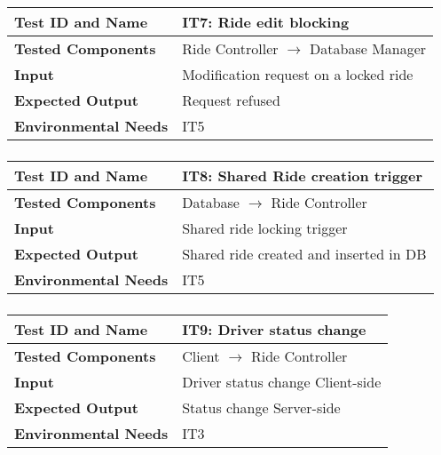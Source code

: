 \vspace{2em}

\noindent\begin{tabular}{l p{}}
    \hline
    \textbf{Test ID and Name} & \textbf{IT7: Ride edit blocking}\\
    \hline
    \textbf{Tested Components} & Ride Controller $\rightarrow$ Database Manager\\
    \hline
    \textbf{Input} & Modification request on a locked ride\\
    \hline
    \textbf{Expected Output} & Request refused\\
    \hline
    \textbf{Environmental Needs} & IT5\\
    \hline
\end{tabular}

\subsubsection{}

\begin{tabular}{l p{}}
    \hline
    \textbf{Test ID and Name} & \textbf{IT8: Shared Ride creation trigger}\\
    \hline
    \textbf{Tested Components} & Database $\rightarrow$ Ride Controller\\
    \hline
    \textbf{Input} & Shared ride locking trigger\\
    \hline
    \textbf{Expected Output} & Shared ride created and inserted in DB\\
    \hline
    \textbf{Environmental Needs} & IT5\\
    \hline
\end{tabular}

\subsubsection{}

\begin{tabular}{l p{}}
    \hline
    \textbf{Test ID and Name} & \textbf{IT9: Driver status change}\\
    \hline
    \textbf{Tested Components} & Client $\rightarrow$ Ride Controller\\
    \hline
    \textbf{Input} & Driver status change Client-side\\
    \hline
    \textbf{Expected Output} & Status change Server-side\\
    \hline
    \textbf{Environmental Needs} & IT3\\
    \hline
\end{tabular}

